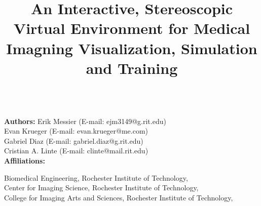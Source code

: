 \documentclass[]{spie}  %
\title{An Interactive, Stereoscopic Virtual Environment for Medical Imagning Visualization, Simulation and Training}
\author{}
\begin{document}
\maketitle

{} \\
\skiplinehalf
%
{\bf Authors:}
\skiplinehalf
{}Erik Messier (E-mail: ejm3149@g.rit.edu)\\
Evan Krueger (E-mail: evan.krueger@me.com)\\
Gabriel Diaz (E-mail: gabriel.diaz@g.rit.edu)\\
Cristian A. Linte (E-mail: clinte@mail.rit.edu)\\
\skiplinehalf
%
{\bf Affiliations:}
\skiplinehalf

Biomedical Engineering, Rochester Institute of Technology, \\
Center for Imaging Science, Rochester Institute of Technology, \\
College for Imaging Arts and Sciences, Rochester Institute of Technology, \\
\end{document}

